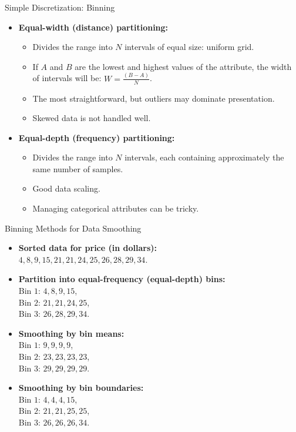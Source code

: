 \begin{frame}{Simple Discretization: Binning}
	\begin{itemize}
		\item \textbf{Equal-width (distance) partitioning:}
		      \begin{itemize}
			      \item Divides the range into $N$ intervals of equal size: uniform
			            grid.
			      \item If $A$ and $B$ are the lowest and highest values of the
			            attribute, the width of intervals will be: $W = \frac{(B - A)}{N}$.
			      \item The most straightforward, but outliers may dominate
			            presentation.
			      \item Skewed data is not handled well.
		      \end{itemize}
		\item \textbf{Equal-depth (frequency) partitioning:}
		      \begin{itemize}
			      \item Divides the range into $N$ intervals, each containing
			            approximately the same number of samples.
			      \item Good data scaling.
			      \item Managing categorical attributes can be tricky.
		      \end{itemize}
	\end{itemize}
\end{frame}

\begin{frame}{Binning Methods for Data Smoothing}
	\begin{itemize}
		\item \textbf{Sorted data for price (in dollars):} \\
		      $4, 8, 9, 15, 21, 21, 24, 25, 26, 28, 29, 34$.
		\item \textbf{Partition into equal-frequency (equal-depth) bins:}\\
		      Bin $1$: $4, 8, 9, 15$,\\
		      Bin $2$: $21, 21, 24, 25$,\\
		      Bin $3$: $26, 28, 29, 34$.
		\item \textbf{Smoothing by bin means:}\\
		      Bin $1$: $9, 9, 9, 9$,\\
		      Bin $2$: $23, 23, 23, 23$,\\
		      Bin $3$: $29, 29, 29, 29$.\\
		\item \textbf{Smoothing by bin boundaries:}\\
		      Bin $1$: $4, 4, 4, 15$,\\
		      Bin $2$: $21, 21, 25, 25$,\\
		      Bin $3$: $26, 26, 26, 34$.\\
	\end{itemize}
\end{frame}

